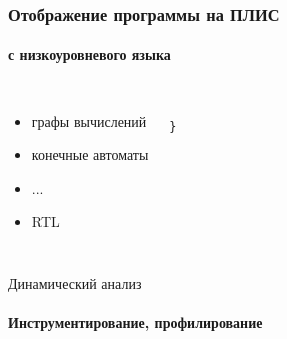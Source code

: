 \documentclass{beamer}              %
\begin{document}
\begin{frame}[fragile]
\frametitle{Отображение программы на ПЛИС}
  \framesubtitle{с низкоуровневого языка}
  \begin{columns}
        \begin{itemize}
            \item графы вычислений
            \item конечные автоматы
            \item ...
            \item RTL
        \end{itemize}      



\begin{lstlisting}[frame=single]

}
\end{lstlisting}
\label{encode_listing}
      
  \end{columns}
  
\end{frame}

\setwatermark{}

\begin{frame}{Динамический анализ}
  \framesubtitle{Инструментирование, профилирование}
\end{frame}
\end{document}
